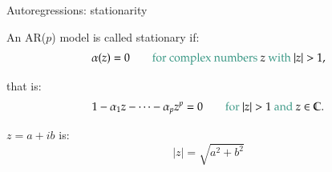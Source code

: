 \documentclass[notes,blackandwhite,mathsans]{beamer}
\begin{document}
%
%
%
%
%





\begin{frame}{Autoregressions: stationarity}


{\color{mcxs2}An} AR($p$) {\color{mcxs2}model is called {\color{mcxs2}stationary} if:}
$$ \alpha(z) = 0 \qquad\text{{\color{mcxs2} for complex numbers} $z$ {\color{mcxs2}with} } |z|>1,$$

{\color{mcxs2}that is:}
$$1 - \alpha_1 z - \dots - \alpha_p z^p = 0 \qquad\text{\color{mcxs2} for } |z|>1 \text{ \color{mcxs2} and }z\in\mathbb{C}.$$

 $z = a + ib$ {\color{mcxs2}is:}
$$ |z| = \sqrt{a^2 + b^2} $$

\end{frame}
\end{document}
